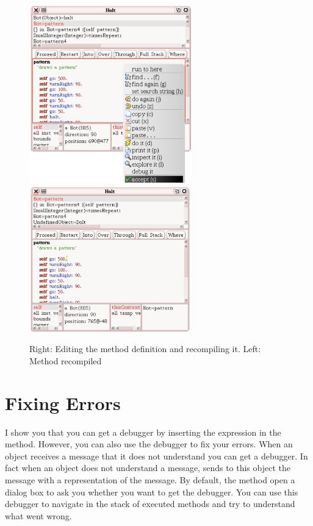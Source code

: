 \begin{figure}[h]
\centerline{\includegraphics[width=7cm]{7DebuggerChangedValueA} \includegraphics[width=7cm]{7DebuggerChangedValueB}}
\caption{Right: Editing the method definition and recompiling it. Left: Method  recompiled\label{fig:6DebuggerPattern}}
\end{figure}

\section{Fixing Errors}
I show you that you can get a debugger by inserting the expression  in the method. However, you can also use the debugger to fix your errors. When an object receives a message that it does not understand you can get a debugger. In fact when an object does not understand a message, \sq sends to this object the message  with a representation of the message. By default, the method  open a dialog box to ask you whether you want to get the debugger. You can use this debugger to navigate in the stack of  executed methods and try to understand what went wrong. 

